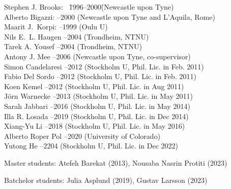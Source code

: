 \documentclass{article}
\begin{document}
\begin{tabbing}
Stephen J. Brooks: ~\= 1996--2000\quad \= (Newcastle upon Tyne)\\
Alberto Bigazzi:    --2000  \> (Newcastle upon Tyne and L'Aquila, Rome)\\
Maarit J.\ Korpi:   --1999  \> (Oulu U)\\
Nils E.\ L. Haugen  --2004  \> (Trondheim, NTNU)\\
Tarek A. Yousef     --2004  \> (Trondheim, NTNU)\\
Antony J. Mee       --2006  \> (Newcastle upon Tyne, co-supervisor)\\
Simon Candelaresi   --2012  \> (Stockholm U, Phil. Lic. in Feb. 2011)\\
Fabio Del Sordo     --2012  \> (Stockholm U, Phil. Lic. in Feb. 2011)\\
Koen Kemel          --2012  \> (Stockholm U, Phil. Lic. in Aug 2011)\\
J\"orn Warnecke     --2013  \> (Stockholm U, Phil. Lic. in May 2011)\\
Sarah Jabbari       --2016  \> (Stockholm U, Phil. Lic. in May 2014) \\
Illa R. Losada      --2019  \> (Stockholm U, Phil. Lic. in Dec 2014) \\
Xiang-Yu Li         --2018  \> (Stockholm U, Phil. Lic. in May 2016) \\
Alberto Roper Pol   --2020  \> (University of Colorado) \\
Yutong He           --2204  \> (Stockholm U, Phil. Lic. in Dec 2022) \\
\end{tabbing}
\vspace{-4mm}

\noindent
Master students: Atefeh Barekat (2013), Nousaba Nasrin Protiti (2023)

\vspace{4mm}
\noindent
Batchelor students: Julia Asplund (2019), Gustav Larsson (2023)

\end{document}

